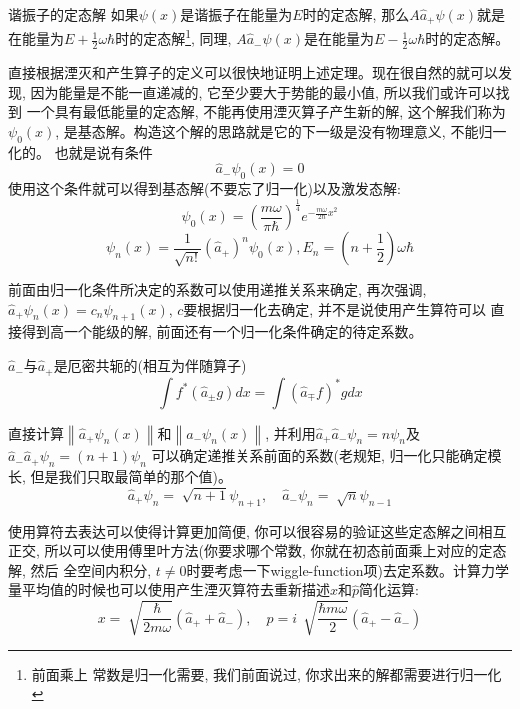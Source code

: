 \documentclass[a4paper,zihao=-4,linespread=1]{ctexrep}
\newenvironment{lequation}{\large\begin{equation}}{\end{equation}}
\begin{document}
    \begin{theorem}{谐振子的定态解}
        如果$\psi(x)$是谐振子在能量为$E$时的定态解, 那么$A\hat{a}_+\psi(x)$就是在能量为$E+\frac{1}{2}\omega\hbar$时的定态解\footnote{前面乘上
        常数是归一化需要, 我们前面说过, 你求出来的解都需要进行归一化}, 同理, $A\hat{a}_-\psi(x)$是在能量为$E-\frac{1}{2}\omega\hbar$时的定态解。
    \end{theorem}
    直接根据湮灭和产生算子的定义可以很快地证明上述定理。现在很自然的就可以发现, 因为能量是不能一直递减的, 它至少要大于势能的最小值, 所以我们或许可以找到
    一个具有最低能量的定态解, 不能再使用湮灭算子产生新的解, 这个解我们称为$\psi_0(x)$, 是基态解。构造这个解的思路就是它的下一级是没有物理意义, 不能归一化的。
    也就是说有条件$$\hat{a}_-\psi_0(x)=0$$使用这个条件就可以得到基态解(不要忘了归一化)以及激发态解:
    \begin{lequation}
        \boxed{
            \psi_0(x)=\left(\frac{m\omega}{\pi\hbar}\right)^{\frac{1}{4}}e^{-\frac{m \omega}{2\hbar}x^2}
        }
    \end{lequation}
    \begin{lequation}
        \boxed{
            \psi_n(x)=\frac{1}{\sqrt{n!}}\left(\hat{a}_+\right)^n\psi_0(x),E_n=\left(n+\frac{1}{2}\right)\omega \hbar
        }
    \end{lequation}

    前面由归一化条件所决定的系数可以使用递推关系来确定, 再次强调, $\hat{a}_+\psi_n(x)=c_n\psi_{n+1}(x)$, $c$要根据归一化去确定, 并不是说使用产生算符可以
    直接得到高一个能级的解, 前面还有一个归一化条件确定的待定系数。
    \begin{theorem}{$\hat{a}_-$与$\hat{a}_+$是厄密共轭的(相互为伴随算子)}
        \begin{lequation}
            \int f^*(\hat{a}_\pm g)dx=\int (\hat{a}_\mp f)^* gdx
        \end{lequation}
    \end{theorem}
    直接计算$\left \| \hat{a}_+\psi_n(x) \right \|$和$\left \| \hat{a}_-\psi_n(x) \right \|$, 并利用$\hat{a}_+\hat{a}_-\psi_n=n\psi_n$及$\hat{a}_-\hat{a}_+\psi_n=(n+1)\psi_n$
    可以确定递推关系前面的系数(老规矩, 归一化只能确定模长, 但是我们只取最简单的那个值)。
    \begin{lequation}
        \boxed{
            \hat{a}_+\psi_n=\sqrt[]{n+1}\psi_{n+1},\quad\hat{a}_-\psi_n=\sqrt[]{n}\psi_{n-1}
        }
    \end{lequation}

    使用算符去表达可以使得计算更加简便, 你可以很容易的验证这些定态解之间相互正交, 所以可以使用傅里叶方法(你要求哪个常数, 你就在初态前面乘上对应的定态解, 然后
    全空间内积分, $t\neq0$时要考虑一下wiggle-function项)去定系数。计算力学量平均值的时候也可以使用产生湮灭算符去重新描述$x$和$\hat{p}$简化运算:
    \begin{lequation}
        \boxed{
            x =\sqrt[]{\frac{\hbar}{2m\omega}}\left(\hat{a}_++\hat{a}_-\right), \quad 
            p =i\,\sqrt[]{\frac{\hbar m \omega}{2}}\left(\hat{a}_+-\hat{a}_-\right)
        }
    \end{lequation}
\end{document}
